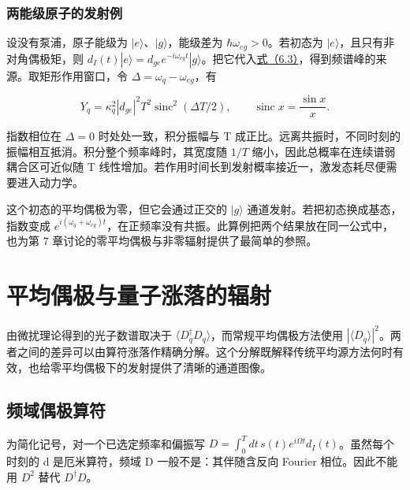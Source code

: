 \documentclass[UTF8,a4paper,zihao=-4,openany,fontset=fandol]{ctexbook}
\begin{document}
\subsection{两能级原子的发射例}


设没有泵浦，原子能级为 $|e\rangle$、$|g\rangle$，能级差为 $\hbar\omega_{eg}>0$。若初态为 $|e\rangle$，且只有非对角偶极矩，则 $d_I(t)|e\rangle=d_{ge}e^{-i\omega_{eg} t}|g\rangle$。把它代入\hyperref[eq:6.3]{式（6.3）}，得到频谱峰的来源。取矩形作用窗口，令 $\Delta=\omega_q-\omega_{eg}$，有



\begin{equation*}
Y_q=\kappa_q^2|d_{ge}|^2T^2
\operatorname{sinc}^2(\Delta T/2),\qquad
\operatorname{sinc}x=\frac{\sin x}{x}.
\tag{6.10}\label{eq:6.10}
\end{equation*}


指数相位在 $\Delta=0$ 时处处一致，积分振幅与 T 成正比。远离共振时，不同时刻的振幅相互抵消。积分整个频率峰时，其宽度随 $1/T$ 缩小，因此总概率在连续谱弱耦合区可近似随 T 线性增加。若作用时间长到发射概率接近一，激发态耗尽便需要进入动力学。



这个初态的平均偶极为零，但它会通过正交的 $|g\rangle$ 通道发射。若把初态换成基态，指数变成 $e^{i(\omega_q+\omega_{eg})t}$，在正频率没有共振。此算例把两个结果放在同一公式中，也为第 7 章讨论的零平均偶极与非零辐射提供了最简单的参照。



\chapter{平均偶极与量子涨落的辐射}\label{ch:07}


由微扰理论得到的光子数谱取决于 $\langle D_q^\dagger D_q\rangle$，而常规平均偶极方法使用 $|\langle D_q\rangle|^2$。两者之间的差异可以由算符涨落作精确分解。这个分解既解释传统平均源方法何时有效，也给零平均偶极下的发射提供了清晰的通道图像。



\section{频域偶极算符}\label{sec:07:1}


为简化记号，对一个已选定频率和偏振写 $D=\int_0^Tdt\,s(t)e^{i\Omega t}d_I(t)$。虽然每个时刻的 d 是厄米算符，频域 D 一般不是：其伴随含反向 Fourier 相位。因此不能用 $D^2$ 替代 $D^\dagger D$。
\end{document}

